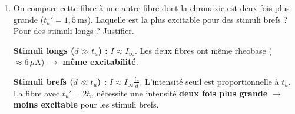 \documentclass[11pt]{article}
\begin{document}
\begin{exercice}
\begin{enumerate}
\item On compare cette fibre à une autre fibre dont la chronaxie est deux fois plus grande ($t_u' = 1,5\,\text{ms}$). Laquelle est la plus excitable pour des stimuli brefs ? Pour des stimuli longs ? Justifier.
\par \textbf{Stimuli longs ($d \gg t_u$) :} $I \approx I_{\infty}$. Les deux fibres ont même rheobase ($\approx 6\,\mu\text{A}$) $\to$ \textbf{même excitabilité}.
\par \textbf{Stimuli brefs ($d \ll t_u$) :} $I \approx I_{\infty} \frac{t_u}{d}$. L'intensité seuil est proportionnelle à $t_u$. La fibre avec $t_u' = 2 t_u$ nécessite une intensité \textbf{deux fois plus grande} $\to$ \textbf{moins excitable} pour les stimuli brefs.
\end{enumerate}
\end{exercice}
\end{document}
